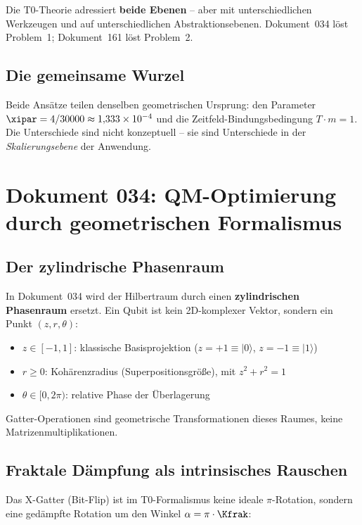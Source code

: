 Die T0-Theorie adressiert \textbf{beide Ebenen} -- aber mit unterschiedlichen
Werkzeugen und auf unterschiedlichen Abstraktionsebenen. Dokument~034 \cite{pascher:qmopt}
löst Problem~1; Dokument~161 \cite{pascher:ising} löst Problem~2.

\subsection{Die gemeinsame Wurzel}

Beide Ansätze teilen denselben geometrischen Ursprung: den Parameter
$\xipar = 4/30000 \approx 1{,}333 \times 10^{-4}$
und die Zeitfeld-Bindungsbedingung $T \cdot m = 1$.
Die Unterschiede sind nicht konzeptuell -- sie sind Unterschiede in der
\emph{Skalierungsebene} der Anwendung.

\clearpage

\section{Dokument 034: QM-Optimierung durch geometrischen Formalismus}
\label{sec:doc034}

\subsection{Der zylindrische Phasenraum}

In Dokument~034 \cite{pascher:qmopt} wird der Hilbertraum durch einen
\textbf{zylindrischen Phasenraum} ersetzt. Ein Qubit ist kein 2D-komplexer Vektor,
sondern ein Punkt $(z, r, \theta)$:

\begin{itemize}
    \item $z \in [-1, 1]$: klassische Basisprojektion ($z=+1 \equiv |0\rangle$,
    $z=-1 \equiv |1\rangle$)
    \item $r \geq 0$: Kohärenzradius (Superpositionsgröße), mit $z^2 + r^2 = 1$
    \item $\theta \in [0, 2\pi)$: relative Phase der Überlagerung
\end{itemize}

Gatter-Operationen sind geometrische Transformationen dieses Raumes, keine Matrizenmultiplikationen.

\subsection{Fraktale Dämpfung als intrinsisches Rauschen}

Das X-Gatter (Bit-Flip) ist im T0-Formalismus keine ideale $\pi$-Rotation, sondern
eine gedämpfte Rotation um den Winkel $\alpha = \pi \cdot \Kfrak$:

